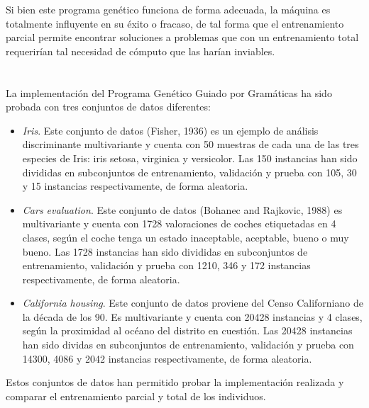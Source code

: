 \documentclass[spanish,a4paper,12pt,twoside]{report}
\begin{document}
  Si bien este programa genético funciona de forma adecuada, la máquina es totalmente influyente en su éxito o fracaso, de tal forma que el entrenamiento parcial permite encontrar soluciones a problemas que con un entrenamiento total requerirían tal necesidad de cómputo que las harían inviables.
  
  \newpage\cleardoublepage

  \chapter*{\vspace{-3cm}{\LARGE 6. Resultados}}
  \setcounter{figure}{16}
  \vspace{-1cm}
  La implementación del Programa Genético Guiado por Gramáticas ha sido probada con tres conjuntos de datos diferentes:
  \begin{itemize}
    \item \emph{Iris}. Este conjunto de datos (Fisher, 1936) es un ejemplo de análisis discriminante multivariante y cuenta con 50 muestras de cada una de las tres especies de Iris: iris setosa, virginica y versicolor. Las 150 instancias han sido divididas en subconjuntos de entrenamiento, validación y prueba con 105, 30 y 15 instancias respectivamente, de forma aleatoria.
    \item \emph{Cars evaluation}. Este conjunto de datos (Bohanec and Rajkovic, 1988) es multivariante y cuenta con 1728 valoraciones de coches etiquetadas en 4 clases, según el coche tenga un estado inaceptable, aceptable, bueno o muy bueno. Las 1728 instancias han sido divididas en subconjuntos de entrenamiento, validación y prueba con 1210, 346 y 172 instancias respectivamente, de forma aleatoria.
    \item \emph{California housing}. Este conjunto de datos proviene del Censo Californiano de la década de los 90. Es multivariante y cuenta con 20428 instancias y 4 clases, según la proximidad al océano del distrito en cuestión. Las 20428 instancias han sido dividas en subconjuntos de entrenamiento, validación y prueba con 14300, 4086 y 2042 instancias respectivamente, de forma aleatoria.
  \end{itemize} \par
  Estos conjuntos de datos han permitido probar la implementación realizada y comparar el entrenamiento parcial y total de los individuos. \par
\end{document}
